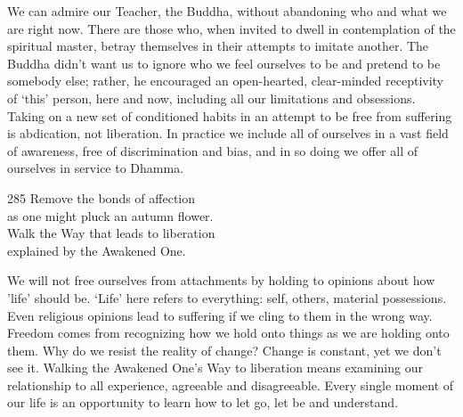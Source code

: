 \begin{dhpRefl}
  We can admire our Teacher, the Buddha, without abandoning who and what we are
  right now. There are those who, when invited to dwell in contemplation of the
  spiritual master, betray themselves in their attempts to imitate another. The
  Buddha didn’t want us to ignore who we feel ourselves to be and pretend to be
  somebody else; rather, he encouraged an open-hearted, clear-minded receptivity
  of ‘this’ person, here and now, including all our limitations and obsessions.
  Taking on a new set of conditioned habits in an attempt to be free from
  suffering is abdication, not liberation. In practice we include all of
  ourselves in a vast field of awareness, free of discrimination and bias, and
  in so doing we offer all of ourselves in service to Dhamma.
\end{dhpRefl}


\begin{dhpVerse}{285}
\label{dhp-285}
Remove the bonds of affection\\
as one might pluck an autumn flower.\\
Walk the Way that leads to liberation\\
explained by the Awakened One.
\end{dhpVerse}

\begin{dhpRefl}
  We will not free ourselves from attachments by holding to opinions about how
  'life' should be. ‘Life’ here refers to everything: self, others, material
  possessions. Even religious opinions lead to suffering if we cling to them in
  the wrong way. Freedom comes from recognizing how we hold onto things as we
  are holding onto them. Why do we resist the reality of change? Change is
  constant, yet we don’t see it. Walking the Awakened One’s Way to liberation
  means examining our relationship to all experience, agreeable and
  disagreeable. Every single moment of our life is an opportunity to learn how
  to let go, let be and understand.
\end{dhpRefl}